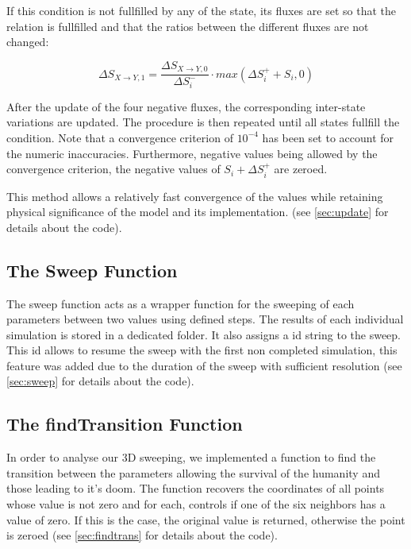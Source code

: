 \documentclass[11pt]{article} %
\begin{document}
If this condition is not fullfilled by any of the state, its fluxes are set so that the relation is fullfilled and that the ratios between the different fluxes are not changed:

\bigskip
\begin{equation} \label{eq:correction}
\Delta S_{X\rightarrow Y,1} = \frac{\Delta S_{X\rightarrow Y,0}}{\Delta S_i^-}\cdot max(\Delta S_i^+ + S_i, 0)
\end{equation}
\bigskip

After the update of the four negative fluxes, the corresponding inter-state variations are updated. The procedure is then repeated until all states fullfill the condition. Note that a convergence criterion of $10^{-4}$ has been set to account for the numeric inaccuracies. Furthermore, negative values being allowed by the convergence criterion, the negative values of $S_i + \Delta S_i^+$ are zeroed.

This method allows a relatively fast convergence of the values while retaining physical significance of the model and its implementation. (see \ref{sec:update} for details about the code).



\subsection{The Sweep Function}\indent

The sweep function acts as a wrapper function for the sweeping of each parameters between two values using defined steps. The results of each individual simulation is stored in a dedicated folder. It also assigns a id string to the sweep. This id allows to resume the sweep with the first non completed simulation, this feature was added due to the duration of the sweep with sufficient resolution (see \ref{sec:sweep} for details about the code).


\subsection{The findTransition Function}\indent

In order to analyse our 3D sweeping, we implemented a function to find the transition between the parameters allowing the survival of the humanity and those leading to it's doom. The function recovers the coordinates of all points whose value is not zero and for each, controls if one of the six neighbors has a value of zero. If this is the case, the original value is returned, otherwise the point is zeroed (see \ref{sec:findtrans} for details about the code).
\end{document}
